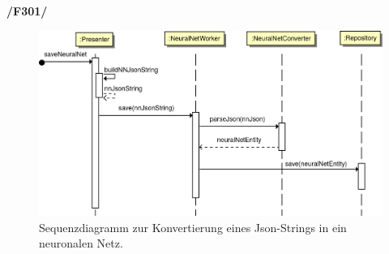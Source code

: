 \textbf{/F301/} 
\begin{figure}[H]
\begin{center}
\includegraphics[width=15cm]{Abbildungen/UML/jan/convertJsonNNSD.png}
\caption{Sequenzdiagramm zur Konvertierung eines Json-Strings in ein neuronalen Netz.}
\label{fig_sdBackpropagation}
\end{center}
\end{figure}

